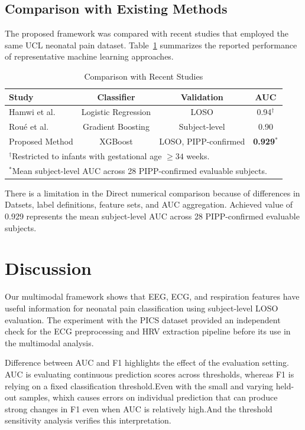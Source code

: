 \documentclass[conference]{IEEEtran}
\begin{document}
\subsection{Comparison with Existing Methods}

The proposed framework was compared with recent studies that employed the same UCL neonatal pain dataset. Table~\ref{tab:comparison} summarizes the reported performance of representative machine learning approaches.

\begin{table}[t]
\caption{Comparison with Recent Studies}
\centering
\begin{tabular}{lccc}
\hline
Study & Classifier & Validation & AUC \\
\hline
Hamwi et al.\cite{hamwi2025eeg} & Logistic Regression & LOSO & 0.94$^{\dagger}$ \\
Roué et al.\cite{roue2025objective} & Gradient Boosting & Subject-level & 0.90 \\
Proposed Method & XGBoost & LOSO, PIPP-confirmed & \textbf{0.929}$^{*}$ \\
\hline
\multicolumn{4}{l}{$^{\dagger}$Restricted to infants with gestational age $\geq 34$ weeks.}\\
\multicolumn{4}{l}{$^{*}$Mean subject-level AUC across 28 PIPP-confirmed evaluable subjects.}\\
\end{tabular}
\label{tab:comparison}
\end{table}

There is a limitation in the Direct numerical comparison because of differences in Datsets, label definitions, feature sets, and AUC aggregation. Achieved value of 0.929 represents the mean subject-level AUC across 28 PIPP-confirmed evaluable subjects.

\section{Discussion}

Our multimodal framework shows that EEG, ECG, and respiration features have useful information for neonatal pain classification using subject-level LOSO evaluation. The experiment with the PICS dataset provided an independent check for the ECG preprocessing and HRV extraction pipeline before its use in the multimodal analysis.

Difference between AUC and F1 highlights the effect of the evaluation setting. AUC is evaluating continuous prediction scores across thresholds, whereas F1 is relying on a fixed classification threshold.Even with the small and varying held-out samples, whixh causes errors on individual prediction that can produce strong changes in F1 even when AUC is relatively high.And the threshold sensitivity analysis verifies this interpretation.
\end{document}
